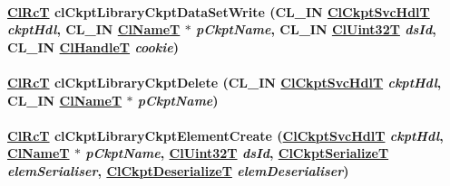 \hypertarget{group__group10_ga8}{
\paragraph[clCkptLibraryCkptDataSetWrite]{\setlength{\rightskip}{0pt plus 5cm}\hyperlink{group__group2_ga18}{Cl\-Rc\-T} cl\-Ckpt\-Library\-Ckpt\-Data\-Set\-Write (CL\_\-IN \hyperlink{cl_ckpt_api_8h_a12}{Cl\-Ckpt\-Svc\-Hdl\-T} {\em ckpt\-Hdl}, CL\_\-IN \hyperlink{struct_cl_name_t}{Cl\-Name\-T} $\ast$ {\em p\-Ckpt\-Name}, CL\_\-IN \hyperlink{group__group2_ga1}{Cl\-Uint32T} {\em ds\-Id}, CL\_\-IN \hyperlink{group__group2_ga10}{Cl\-Handle\-T} {\em cookie})}\hfill}
\label{group__group10_ga8}


\hypertarget{group__group10_ga5}{
\paragraph[clCkptLibraryCkptDelete]{\setlength{\rightskip}{0pt plus 5cm}\hyperlink{group__group2_ga18}{Cl\-Rc\-T} cl\-Ckpt\-Library\-Ckpt\-Delete (CL\_\-IN \hyperlink{cl_ckpt_api_8h_a12}{Cl\-Ckpt\-Svc\-Hdl\-T} {\em ckpt\-Hdl}, CL\_\-IN \hyperlink{struct_cl_name_t}{Cl\-Name\-T} $\ast$ {\em p\-Ckpt\-Name})}\hfill}
\label{group__group10_ga5}


\hypertarget{group__group10_ga12}{
\paragraph[clCkptLibraryCkptElementCreate]{\setlength{\rightskip}{0pt plus 5cm}\hyperlink{group__group2_ga18}{Cl\-Rc\-T} cl\-Ckpt\-Library\-Ckpt\-Element\-Create (\hyperlink{cl_ckpt_api_8h_a12}{Cl\-Ckpt\-Svc\-Hdl\-T} {\em ckpt\-Hdl}, \hyperlink{struct_cl_name_t}{Cl\-Name\-T} $\ast$ {\em p\-Ckpt\-Name}, \hyperlink{group__group2_ga1}{Cl\-Uint32T} {\em ds\-Id}, \hyperlink{group__group10_ga0}{Cl\-Ckpt\-Serialize\-T} {\em elem\-Serialiser}, \hyperlink{group__group10_ga1}{Cl\-Ckpt\-Deserialize\-T} {\em elem\-Deserialiser})}\hfill}
\label{group__group10_ga12}


